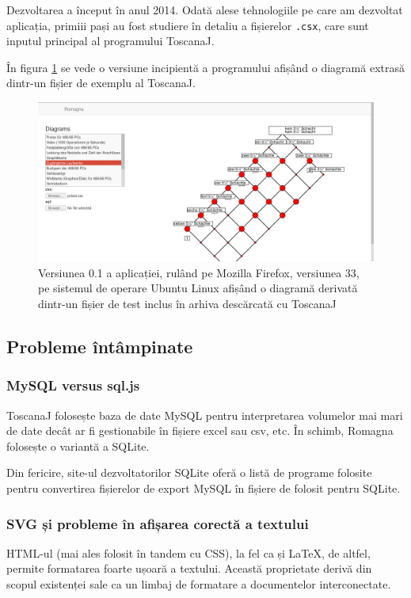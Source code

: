 \documentclass[12pt, a4paper, twoside, romanian]{teza-upb}
\begin{document}
    Dezvoltarea a început în anul 2014. Odată alese tehnologiile pe care am dezvoltat aplicația, primiii pași au fost studiere în detaliu a fișierelor \verb=.csx=, care sunt inputul principal al programului ToscanaJ.

    În figura \ref{screenshot:romagna:1} se vede o versiune incipientă a programului afișând o diagramă extrasă dintr-un fișier de exemplu al ToscanaJ.
    \begin{figure}[h]
      \includegraphics[width=\textwidth]{romagna-01.png}
      \caption{Versiunea 0.1 a aplicației, rulând pe Mozilla Firefox, versiunea 33, pe sistemul de operare Ubuntu Linux afișând o diagramă derivată dintr-un fișier de test inclus în arhiva descărcată cu ToscanaJ}
      \label{screenshot:romagna:1}
      \end{figure}
    \subsection{Probleme întâmpinate}
      
      \subsubsection{MySQL versus sql.js} %
      \label{ssub:MySQL versus sql.js}

        ToscanaJ folosește baza de date MySQL pentru interpretarea volumelor mai mari de date decât ar fi gestionabile în fișiere excel sau csv, etc. În schimb, Romagna folosește o variantă a SQLite.

      Din fericire, site-ul dezvoltatorilor SQLite oferă o listă \cite{sqlite:converters} de programe folosite pentru convertirea fișierelor de export MySQL în fișiere de folosit pentru SQLite.

      \subsubsection{SVG și probleme în afișarea corectă a textului}
      \label{subsubsec:svg-problems}
        HTML-ul (mai ales folosit în tandem cu CSS), la fel ca și \LaTeX, de altfel, permite formatarea foarte ușoară a textului. Această proprietate derivă din scopul existenței sale ca un limbaj de formatare a documentelor interconectate.
\end{document}
